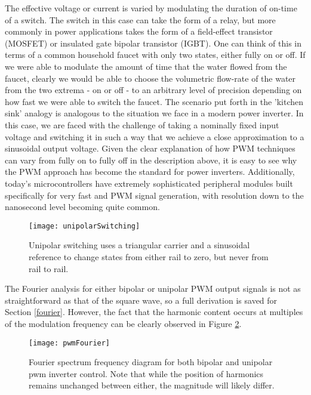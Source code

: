 The effective voltage or current is varied by modulating the duration of on-time of a switch. The switch in this case can take the form of a relay, but more commonly in power applications takes the form of a field-effect transistor (MOSFET) or insulated gate bipolar transistor (IGBT). One can think of this in terms of a common household faucet with only two states, either fully on or off. If we were able to modulate the amount of time that the water flowed from the faucet, clearly we would be able to choose the volumetric flow-rate of the water from the two extrema - on or off - to an arbitrary level of precision depending on how fast we were able to switch the faucet. The scenario put forth in the 'kitchen sink' analogy is analogous to the situation we face in a modern power inverter. In this case, we are faced with the challenge of taking a nominally fixed input voltage and switching it in such a way that we achieve a close approximation to a sinusoidal output voltage. Given the clear explanation of how PWM techniques can vary from fully on to fully off in the description above, it is easy to see why the PWM approach has become the standard for power inverters. Additionally, today's microcontrollers have extremely sophisticated peripheral modules built specifically for very fast and PWM signal generation, with resolution down to the nanosecond level becoming quite common. 


\begin{figure}[h]
\centering
\texttt{[image: unipolarSwitching]}
\caption{Unipolar switching uses a triangular carrier and a sinusoidal reference to change states from either rail to zero, but never from rail to rail.\cite{inverterFourier}}
\label{unipolar}
\end{figure}

The Fourier analysis for either bipolar or unipolar PWM output signals is not as straightforward as that of the square wave, so a full derivation is saved for Section \ref{fourier}. However, the fact that the harmonic content occurs at multiples of the modulation frequency can be clearly observed in Figure \ref{pwmFourier}. 

\begin{figure}[h]
\centering
\texttt{[image: pwmFourier]}
\caption{Fourier spectrum frequency diagram for both bipolar and unipolar pwm inverter control. Note that while the position of harmonics remains unchanged between either, the magnitude will likely differ. \cite{inverterFourier}}
\label{pwmFourier}
\end{figure}

